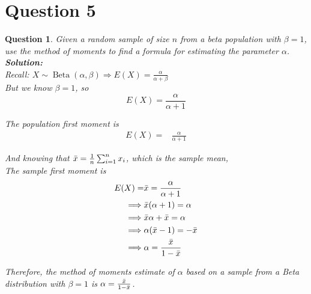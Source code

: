 \documentclass{article}
\theoremstyle{questionstyle}
\newtheorem{myquestion}{Question}
\begin{document}
\section{Question 5}
\begin{myquestion}
    Given a random sample of size \(n\) from a beta population with \(\beta =1 \), use the method of moments to find a formula for estimating the parameter \(\alpha\).\\

    \textbf{Solution:}\\
    Recall: \(X \sim \operatorname{Beta}(\alpha, \beta) \Rightarrow E(X) = \frac{\alpha}{\alpha + \beta}\)\\ 
    But we know \(\beta = 1\), so 
    \[E(X) =  \frac{\alpha}{\alpha + 1} \]
    
    The population first moment is
    \begin{align*}
        E(X) = & \frac{\alpha}{\alpha + 1}
    \end{align*}

    \noindent
    And knowing that \(\Bar{x} = \frac{1}{n} \sum_{i=1}^n x_i\), which is the sample mean,\\
    
    The sample first moment is 
    \begin{align*}
        E(X) = & \Bar{x} = \frac{\alpha}{\alpha + 1}\\
        \implies & \Bar{x}(\alpha + 1 ) = \alpha\\
        \implies & \Bar{x}\alpha + \Bar{x} = \alpha\\
        \implies & \alpha(\Bar{x} - 1) = -\Bar{x}\\
        \implies & \alpha = \frac{\Bar{x}}{1-\Bar{x}}
    \end{align*}
    
    Therefore, the method of moments estimate of \(\alpha\) based on a sample from a Beta distribution with \(\beta=1\) is \(\alpha = \frac{\Bar{x}}{1-\Bar{x}}\).
\end{myquestion} %
\end{document}
